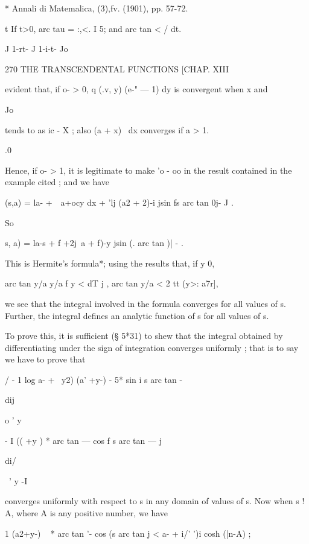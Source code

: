 * Annali di Matemalica, (3),fv. (1901), pp. 57-72.

t If t>0, arc tau = :,<. I 5; and arc tan < / dt.

J 1-rt- J 1-i-t- Jo



270 THE TRANSCENDENTAL FUNCTIONS [CHAP. XIII

evident that, if o- > 0, q (.v, y) (e-" — 1) dy is convergent when x
and

Jo

tends to as ic - X ; also (a + x)~ dx converges if a > 1.

.0

Hence, if o- > 1, it is legitimate to make 'o - oo in the result
contained in the example cited ; and we have

 (s,a) = la- +\ \ a+ocy dx + 'lj (a2 + 2)-i jsin fs arc tan 0j- J .

So

  s, a) = la-s + f +2j\ a + f)-y jsin (. arc tan )| - .

This is Hermite's formula*; using the results that, if y 0,

arc tan y/a y/a f y < dT j , arc tan y/a < 2 tt (y>: a7r],

we see that the integral involved in the formula converges for all
values of s. Further, the integral defines an analytic function of s
for all values of s.

To prove this, it is sufficient (§ 5*31) to shew that the integral
obtained by differentiating under the sign of integration converges
uniformly ; that is to say we have to prove that



/ - 1 log a- + \ y2) (a' +y-) - 5* sin i s arc tan -



dij



o ' y



- I (( +y ) * arc tan — cos f s arc tan — j



di/



~' y -I



converges uniformly with respect to s in any domain of values of s.
Now when s ! A, where A is any positive number, we have

1 (a2+y-) ~ * arc tan '- cos (s arc tan j < a- + i/' ')i cosh (|n-A) ;

